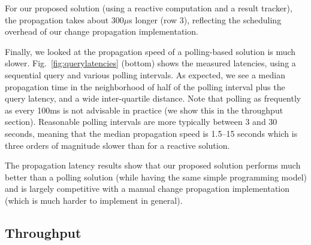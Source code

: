 For our proposed solution (using a reactive computation and a result tracker), the propagation takes about 300$\mu$s longer (row 3), reflecting the scheduling overhead of our change propagation implementation.

Finally, we looked at the propagation speed of a polling-based solution is much slower. Fig.~\ref{fig:querylatencies} (bottom) shows the measured latencies, using a sequential query and various polling intervals. As expected, we see a median propagation time in the neighborhood of half of the polling interval plus the query latency, and a wide inter-quartile distance. Note that polling as frequently as every 100ms is not advisable in practice (we show this in the throughput section). Reasonable polling intervals are more typically between 3 and 30 seconds, meaning that the median propagation speed is 1.5--15 seconds which is three orders of magnitude slower than for a reactive solution. 

The propagation latency results show that our proposed solution performs much better than a polling solution (while having the same simple programming model) and is largely competitive with a manual change propagation implementation (which is much harder to implement in general). 


\subsection{Throughput}\label{sec:throughput}